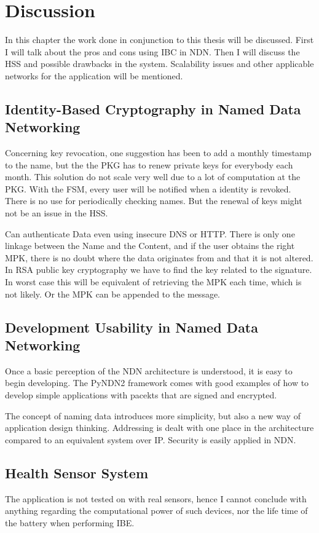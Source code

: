 \chapter{Discussion}
In this chapter the work done in conjunction to this thesis will be discussed. 
First I will talk about the pros and cons using \gls{IBC} in \gls{NDN}.
Then I will discuss the \gls{HSS} and possible drawbacks in the system. 
Scalability issues and other applicable networks for the application will be mentioned.

\section{Identity-Based Cryptography in Named Data Networking}
Concerning key revocation, one suggestion has been to add a monthly timestamp to the name, but the the \gls{PKG} has to renew private keys for everybody each month. 
This solution do not scale very well due to a lot of computation at the \gls{PKG}.
With the \gls{FSM}, every user will be notified when a identity is revoked.
There is no use for periodically checking names.
But the renewal of keys might not be an issue in the \gls{HSS}. 

Can authenticate Data even using insecure DNS or HTTP. 
There is only one linkage between the Name and the Content, and if the user obtains the right \gls{MPK}, there is no doubt where the data originates from and that it is not altered.
In RSA public key cryptography we have to find the key related to the signature. 
In worst case this will be equivalent of retrieving the \gls{MPK} each time, which is not likely. 
Or the \gls{MPK} can be appended to the message.

\section{Development Usability in Named Data Networking}
Once a basic perception of the \gls{NDN} architecture is understood, it is easy to begin developing.
The \gls{PyNDN2} framework comes with good examples of how to develop simple applications with pacekts that are signed and encrypted.

The concept of naming data introduces more simplicity, but also a new way of application design thinking.
Addressing is dealt with one place in the architecture compared to an equivalent system over \gls{IP}. 
Security is easily applied in \gls{NDN}.

\section{Health Sensor System}
The application is not tested on with real sensors, hence I cannot conclude with anything regarding the computational power of such devices, nor the life time of the battery when performing \gls{IBE}.  

